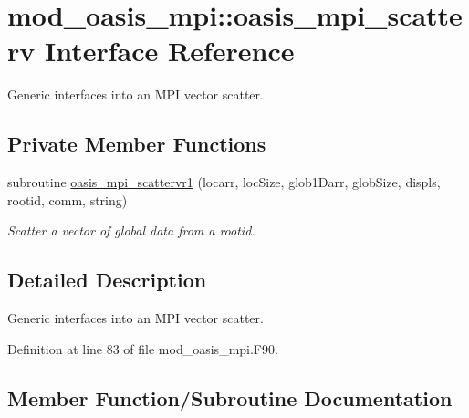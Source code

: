 \hypertarget{interfacemod__oasis__mpi_1_1oasis__mpi__scatterv}{}\section{mod\+\_\+oasis\+\_\+mpi\+:\+:oasis\+\_\+mpi\+\_\+scatterv Interface Reference}
\label{interfacemod__oasis__mpi_1_1oasis__mpi__scatterv}


Generic interfaces into an M\+PI vector scatter.  


\subsection*{Private Member Functions}
\begin{DoxyCompactItemize}
\item 
subroutine \hyperlink{interfacemod__oasis__mpi_1_1oasis__mpi__scatterv_a3fcba01cf7b4de3c6c05fa8999f5c00d}{oasis\+\_\+mpi\+\_\+scattervr1} (locarr, loc\+Size, glob1\+Darr, glob\+Size, displs, rootid, comm, string)
\begin{DoxyCompactList}\small\item\em Scatter a vector of global data from a rootid. \end{DoxyCompactList}\end{DoxyCompactItemize}


\subsection{Detailed Description}
Generic interfaces into an M\+PI vector scatter. 

Definition at line 83 of file mod\+\_\+oasis\+\_\+mpi.\+F90.



\subsection{Member Function/\+Subroutine Documentation}
\mbox{\label{interfacemod__oasis__mpi_1_1oasis__mpi__scatterv_a3fcba01cf7b4de3c6c05fa8999f5c00d}} 
